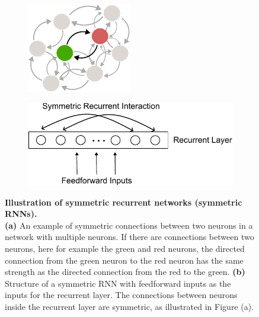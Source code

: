 \documentclass[11pt]{article}
\begin{document}
		\begin{figure}[H] 
			\begin{subfigure}[b]{0.4\textwidth}
				\centering
				\includegraphics[width=0.2\textheight]{../figures/sym_net.pdf}
				\vspace{0.2cm}
				\caption{}
			\end{subfigure}
			\hspace{0.4cm}
			\begin{subfigure}[b]{0.4\textwidth}
				\centering
				\includegraphics[width=0.4\textheight]{../figures/sym_recurrent.pdf}
				\caption{}
			\end{subfigure}
		\caption{\textbf{Illustration of symmetric recurrent networks (symmetric RNNs).} \\ \textbf{(a)} An example of symmetric connections between two neurons in a network with multiple neurons. If there are connections between two neurons, here for example the green and red neurons, the directed connection from the green neuron to the red neuron has the same strength as the directed connection from the red to the green. \textbf{(b)} Structure of a symmetric RNN with feedforward inputs as the inputs for the recurrent layer. The connections between neurons inside the recurrent layer are symmetric, as illustrated in Figure (a).}
		\label{fig:symmetric_RNN}
		\end{figure}
	
\end{document}
